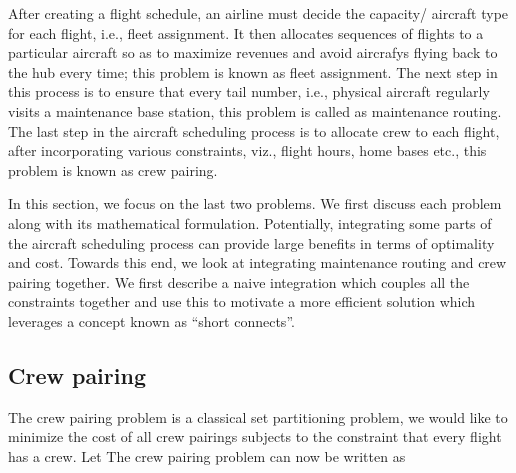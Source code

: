\documentclass[letterpaper, 10pt, twocolumn, reqno]{amsart}
\begin{document}

After creating a flight schedule, an airline must decide the capacity/ aircraft type for each flight, i.e., fleet assignment. It then allocates sequences of flights to a particular aircraft so as to maximize revenues and avoid aircrafys flying back to the hub every time; this problem is known as fleet assignment. The next step in this process is to ensure that every tail number, i.e., physical aircraft regularly visits a maintenance base station, this problem is called as maintenance routing. The last step in the aircraft scheduling process is to allocate crew to each flight, after incorporating various constraints, viz., flight hours, home bases etc., this problem is known as crew pairing.

In this section, we focus on the last two problems. We first discuss each problem along with its mathematical formulation. Potentially, integrating some parts of the aircraft scheduling process can provide large benefits in terms of optimality and cost. Towards this end, we look at integrating maintenance routing and crew pairing together. We first describe a naive integration which couples all the constraints together and use this to motivate a more efficient solution which leverages a concept known as ``short connects''.

\subsection{Crew pairing}
\label{ssec:crew_pairing}

The crew pairing problem is a classical set partitioning problem, we would like to minimize the cost of all crew pairings subjects to the constraint that every flight has a crew. Let
The crew pairing problem can now be written as
\end{document}
